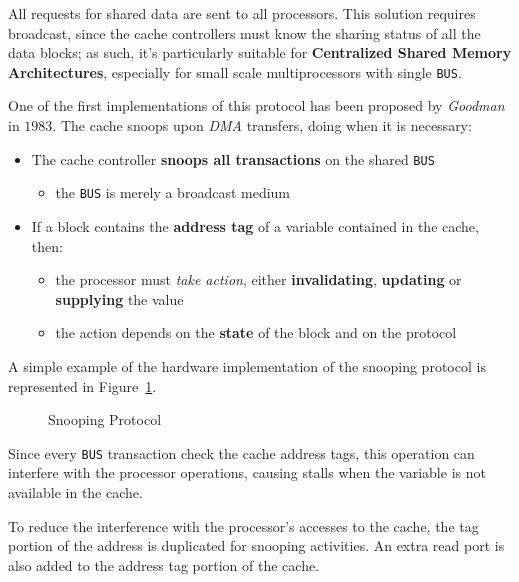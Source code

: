 \documentclass[english]{article}
\begin{document}
All requests for shared data are sent to all processors.
This solution requires broadcast, since the cache controllers must know the sharing status of all the data blocks;
as such, it's particularly suitable for \textbf{Centralized Shared Memory Architectures}, especially for small scale multiprocessors with single \texttt{BUS}.

\bigskip
One of the first implementations of this protocol has been proposed by \textit{Goodman} in \(1983\).
The cache snoops upon \textit{DMA} transfers, doing  when it is necessary:

\begin{itemize}
  \item The cache controller \textbf{snoops all transactions} on the shared \texttt{BUS}
        \begin{itemize}
          \item the \texttt{BUS} is merely a broadcast medium
        \end{itemize}
  \item If a block contains the \textbf{address tag} of a variable contained in the cache, then:
        \begin{itemize}
          \item the processor must \textit{take action}, either \textbf{invalidating}, \textbf{updating} or \textbf{supplying} the value
          \item the action depends on the \textbf{state} of the block and on the protocol
        \end{itemize}
\end{itemize}

A simple example of the hardware implementation of the snooping protocol is represented in Figure~\ref{fig:snooping-protocol}.

\begin{figure}[htbp]
  \bigskip
  \centering
  \caption{Snooping Protocol}
  \label{fig:snooping-protocol}
  \bigskip
\end{figure}

\bigskip
Since every \texttt{BUS} transaction check the cache address tags, this operation can interfere with the processor operations, causing stalls when the variable is not available in the cache.

To reduce the interference with the processor's accesses to the cache, the tag portion of the address is duplicated for snooping activities.
An extra read port is also added to the address tag portion of the cache.
\end{document}
